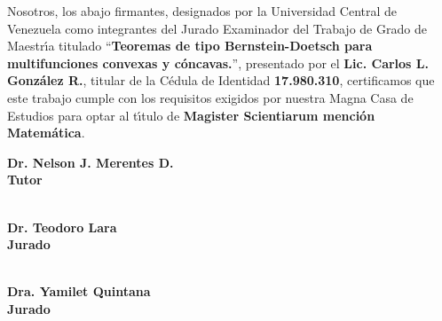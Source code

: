 
\thispagestyle{empty}
Nosotros, los abajo firmantes, designados por la Universidad Central
de Venezuela como integrantes del Jurado Examinador del Trabajo de 
Grado de Maestr\'{\i}a titulado ``\textbf{Teoremas de tipo Bernstein-Doetsch para
multifunciones convexas y c\'oncavas.}'', presentado por el
\textbf{Lic. Carlos L. Gonz\'alez R.}, titular de la C\'edula de Identidad
\textbf{17.980.310}, certificamos que este trabajo cumple con los
requisitos exigidos por nuestra Magna Casa de Estudios para optar al
t\'{\i}tulo de \textbf{Magister Scientiarum mención Matem\'atica}. \vspace{1.4cm}
\begin{center}
\vspace{1cm}
\underline{\hspace{8cm}}

\vspace{0.5cm}

\textbf{Dr. Nelson J. Merentes D.\\Tutor}

\vspace{2cm}

\underline{\hspace{8cm}}

\vspace{0.3cm}

\textbf{ \\Dr. Teodoro Lara\\Jurado}

\vspace{2cm}

\underline{\hspace{8cm}}

\vspace{0.3cm}

\textbf{ \\Dra. Yamilet Quintana\\Jurado}


\end{center}

\newpage
